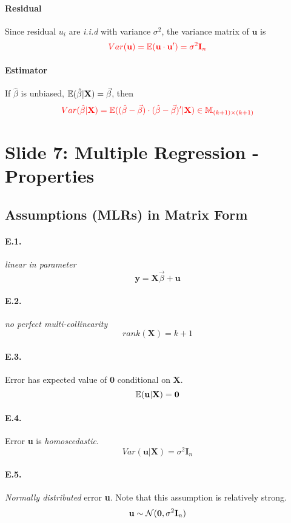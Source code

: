 \documentclass[]{article}
\begin{document}
    			\paragraph{Residual} Since residual $u_i$ are \emph{i.i.d} with variance $\sigma^2$, the variance matrix of $\textbf{u}$ is
    			\[\textcolor{red}{
    				Var(\textbf{u}) = \mathbb{E}({\textbf{u} \cdot \textbf{u}'}) = \sigma^2 \textbf{I}_n
    			}\]
    			
    			\paragraph{Estimator} If $\hat{\beta}$ is unbiased, $\mathbb{E}({\hat{\beta} | \textbf{X}}) = \vec{\beta}$, then 
    			\[\textcolor{red}{
    				Var(\hat{\beta}|\textbf{X}) = \mathbb{E}({(\hat{\beta} - \vec{\beta})\cdot(\hat{\beta} - \vec{\beta})' | \textbf{X}}) \in \mathbb{M}_{(k+1) \times (k+1)}
    			}\]
    \section{Slide 7: Multiple Regression - Properties}
    	\subsection{Assumptions (MLRs) in Matrix Form}
    		\paragraph{E.1.} \emph{linear in parameter}
    		\[
    			\textbf{y} = \textbf{X}\vec{\beta} + \textbf{u}
    		\]
    		\paragraph{E.2.} \emph{no perfect multi-collinearity}
    		\[
    			rank(\textbf{X}) = k +1
    		\]
    		\paragraph{E.3.} Error has expected value of \textbf{0} conditional on \textbf{X}.
    		\[
    			\mathbb{E}({\textbf{u}|\textbf{X}}) = \textbf{0}
    		\]
    		\paragraph{E.4.} Error \textbf{u} is \emph{homoscedastic}.
    		\[
    			Var(\textbf{u}|\textbf{X}) = \sigma^2 \textbf{I}_n
    		\]
    		\paragraph{E.5.} \emph{Normally distributed} error \textbf{u}. Note that this assumption is relatively strong.
    		\[
    			\textbf{u} \sim \mathcal{{N}}(\textbf{0}, \sigma^2 \textbf{I}_n)
    		\]
\end{document}

